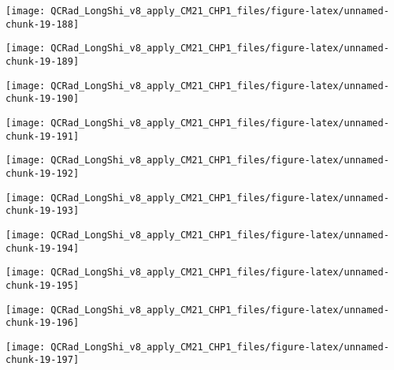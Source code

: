 \documentclass[
  10pt,
  a4paper,oneside]{article}
\begin{document}
\begin{center}\texttt{[image: QCRad\_LongShi\_v8\_apply\_CM21\_CHP1\_files/figure-latex/unnamed-chunk-19-188]} \end{center}

\begin{center}\texttt{[image: QCRad\_LongShi\_v8\_apply\_CM21\_CHP1\_files/figure-latex/unnamed-chunk-19-189]} \end{center}

\begin{center}\texttt{[image: QCRad\_LongShi\_v8\_apply\_CM21\_CHP1\_files/figure-latex/unnamed-chunk-19-190]} \end{center}

\begin{center}\texttt{[image: QCRad\_LongShi\_v8\_apply\_CM21\_CHP1\_files/figure-latex/unnamed-chunk-19-191]} \end{center}

\begin{center}\texttt{[image: QCRad\_LongShi\_v8\_apply\_CM21\_CHP1\_files/figure-latex/unnamed-chunk-19-192]} \end{center}

\begin{center}\texttt{[image: QCRad\_LongShi\_v8\_apply\_CM21\_CHP1\_files/figure-latex/unnamed-chunk-19-193]} \end{center}

\begin{center}\texttt{[image: QCRad\_LongShi\_v8\_apply\_CM21\_CHP1\_files/figure-latex/unnamed-chunk-19-194]} \end{center}

\begin{center}\texttt{[image: QCRad\_LongShi\_v8\_apply\_CM21\_CHP1\_files/figure-latex/unnamed-chunk-19-195]} \end{center}

\begin{center}\texttt{[image: QCRad\_LongShi\_v8\_apply\_CM21\_CHP1\_files/figure-latex/unnamed-chunk-19-196]} \end{center}

\begin{center}\texttt{[image: QCRad\_LongShi\_v8\_apply\_CM21\_CHP1\_files/figure-latex/unnamed-chunk-19-197]} \end{center}
\end{document}
